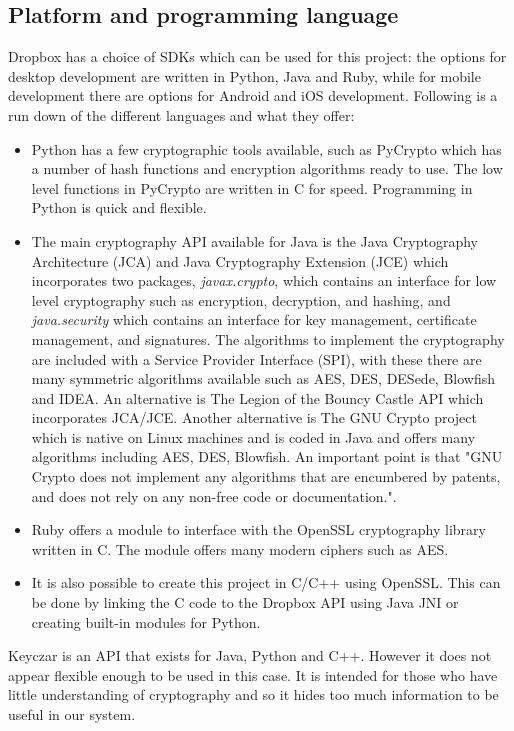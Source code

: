 \documentclass[12pt, titlepage]{article}
\begin{document}
\subsection{Platform and programming language}
Dropbox has a choice of SDKs which can be used for this project: the options for desktop development are written in Python, Java and Ruby, while for mobile development there are options for Android and iOS development.
\newline Following is a run down of the different languages and what they offer:
\begin{itemize}
\item Python has a few cryptographic tools available, such as PyCrypto which has a number of hash functions and encryption algorithms ready to use. The low level functions in PyCrypto are written in C for speed.\cite{pyCrypto} Programming in Python is quick and flexible.
\item The main cryptography API available for Java is the Java Cryptography Architecture (JCA) and Java Cryptography Extension (JCE) which incorporates two packages, \textit{javax.crypto}, which contains an interface for low level cryptography such as encryption, decryption, and hashing, and \textit{java.security} which contains an interface for key management, certificate management, and signatures. The algorithms to implement the cryptography are included with a Service Provider Interface (SPI), with these there are many symmetric algorithms available such as AES, DES, DESede, Blowfish and IDEA\cite{javaJCA}. An alternative is The Legion of the Bouncy Castle API which incorporates JCA/JCE\cite{bouncyCastle}. Another alternative is The GNU Crypto project which is native on Linux machines and is coded in Java and offers many algorithms including AES, DES, Blowfish. An important point is that "GNU Crypto does not implement any algorithms that are encumbered by patents, and does not rely on any non-free code or documentation."\cite{gnuCrypto}.
\item Ruby offers a module to interface with the OpenSSL cryptography library written in C. The module offers many modern ciphers such as AES.\cite{rubyOpenSSL}
\item It is also possible to create this project in C/C++ using OpenSSL. This can be done by linking the C code to the Dropbox API using Java JNI or creating built-in modules for Python.
\end{itemize}
Keyczar is an API that exists for Java, Python and C++.\cite{keyczar} However it does not appear flexible enough to be used in this case. It is intended for those who have little understanding of cryptography and so it hides too much information to be useful in our system.
\end{document}

